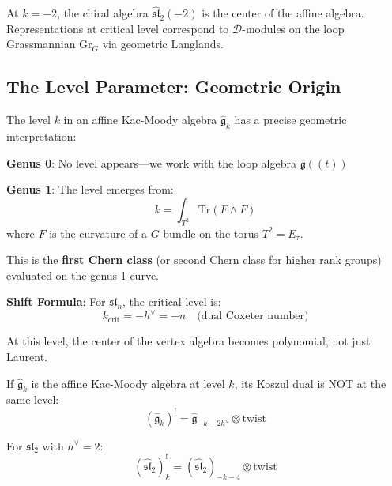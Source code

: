 \begin{corollary}
At $k = -2$, the chiral algebra $\widehat{\mathfrak{sl}}_2(-2)$ is the center of the affine algebra. Representations at critical level correspond to $\mathcal{D}$-modules on the loop Grassmannian $\text{Gr}_{G}$ via geometric Langlands.
\end{corollary}

\subsection{The Level Parameter: Geometric Origin}
\label{subsec:level-geometric-origin}

\begin{remark}
The level $k$ in an affine Kac-Moody algebra $\widehat{\mathfrak{g}}_k$ has a precise geometric interpretation:

\textbf{Genus 0}: No level appears---we work with the loop algebra $\mathfrak{g}((t))$

\textbf{Genus 1}: The level emerges from:
\begin{equation}
k = \int_{T^2} \text{Tr}(F \wedge F)
\end{equation}
where $F$ is the curvature of a $G$-bundle on the torus $T^2 = E_\tau$.

This is the \textbf{first Chern class} (or second Chern class for higher rank groups) evaluated on the genus-1 curve.

\textbf{Shift Formula}: For $\mathfrak{sl}_n$, the critical level is:
\begin{equation}
k_{\text{crit}} = -h^\vee = -n \quad \text{(dual Coxeter number)}
\end{equation}

At this level, the center of the vertex algebra becomes polynomial, not just Laurent.
\end{remark}

\begin{theorem}
If $\widehat{\mathfrak{g}}_k$ is the affine Kac-Moody algebra at level $k$, its Koszul dual is NOT at the same level:
\begin{equation}
(\widehat{\mathfrak{g}}_k)^! = \widehat{\mathfrak{g}}_{-k - 2h^\vee} \otimes \text{twist}
\end{equation}

For $\mathfrak{sl}_2$ with $h^\vee = 2$:
\begin{equation}
(\widehat{\mathfrak{sl}}_2)_k^! = (\widehat{\mathfrak{sl}}_2)_{-k-4} \otimes \text{twist}
\end{equation}
\end{theorem}

